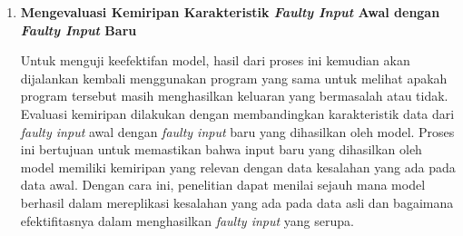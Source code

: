 \begin{enumerate}[topsep=0pt]
    \item \textbf{Mengevaluasi Kemiripan Karakteristik 
    \emph{Faulty Input} Awal dengan \emph{Faulty Input} 
    Baru}

    Untuk menguji keefektifan model, hasil dari proses 
    ini kemudian akan dijalankan kembali menggunakan 
    program yang sama untuk melihat apakah program 
    tersebut masih menghasilkan keluaran yang bermasalah 
    atau tidak. Evaluasi kemiripan dilakukan dengan 
    membandingkan karakteristik data dari 
    \emph{faulty input} awal dengan \emph{faulty input}
    baru yang dihasilkan oleh model. Proses ini 
    bertujuan untuk memastikan bahwa input baru 
    yang dihasilkan oleh model memiliki kemiripan 
    yang relevan dengan data kesalahan yang ada 
    pada data awal. Dengan cara ini, penelitian 
    dapat menilai sejauh mana model berhasil dalam 
    mereplikasi kesalahan yang ada pada data asli 
    dan bagaimana efektifitasnya dalam menghasilkan 
    \emph{faulty input} yang serupa.

  \end{enumerate}

  

